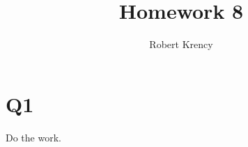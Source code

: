 \documentclass[12pt]{article}
\title{Homework 8}
\author{Robert Krency}
\date{}
\begin{document}
\maketitle

\section*{Q1}

Do the work.
\end{document}

